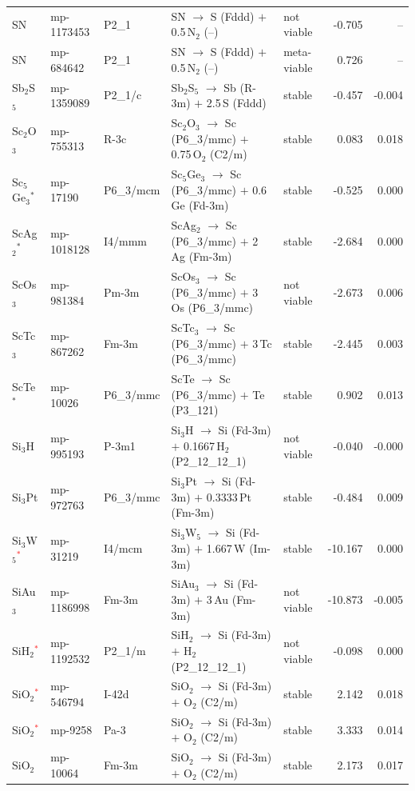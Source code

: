 \begin{longtable}{@{}ll l@{\hspace{4pt}} p{4.6cm} l@{\hspace{4pt}} rr@{}}
SN & mp-1173453 & P2\_1 & SN $\to$ S (Fddd) $+$ 0.5\,N$_{2}$ (--) & not viable & -0.705 & -- \\
SN & mp-684642 & P2\_1 & SN $\to$ S (Fddd) $+$ 0.5\,N$_{2}$ (--) & meta-viable & 0.726 & -- \\
Sb$_{2}$S$_{5}$ & mp-1359089 & P2\_1/c & Sb$_{2}$S$_{5}$ $\to$ Sb (R-3m) $+$ 2.5\,S (Fddd) & stable & -0.457 & -0.004 \\
Sc$_{2}$O$_{3}$ & mp-755313 & R-3c & Sc$_{2}$O$_{3}$ $\to$ Sc (P6\_3/mmc) $+$ 0.75\,O$_{2}$ (C2/m) & stable & 0.083 & 0.018 \\
Sc$_{5}$Ge$_{3}$$^*$ & mp-17190 & P6\_3/mcm & Sc$_{5}$Ge$_{3}$ $\to$ Sc (P6\_3/mmc) $+$ 0.6\,Ge (Fd-3m) & stable & -0.525 & 0.000 \\
ScAg$_{2}$$^*$ & mp-1018128 & I4/mmm & ScAg$_{2}$ $\to$ Sc (P6\_3/mmc) $+$ 2\,Ag (Fm-3m) & stable & -2.684 & 0.000 \\
ScOs$_{3}$ & mp-981384 & Pm-3m & ScOs$_{3}$ $\to$ Sc (P6\_3/mmc) $+$ 3\,Os (P6\_3/mmc) & not viable & -2.673 & 0.006 \\
ScTc$_{3}$ & mp-867262 & Fm-3m & ScTc$_{3}$ $\to$ Sc (P6\_3/mmc) $+$ 3\,Tc (P6\_3/mmc) & stable & -2.445 & 0.003 \\
ScTe$^*$ & mp-10026 & P6\_3/mmc & ScTe $\to$ Sc (P6\_3/mmc) $+$ Te (P3\_121) & stable & 0.902 & 0.013 \\
Si$_{3}$H & mp-995193 & P-3m1 & Si$_{3}$H $\to$ Si (Fd-3m) $+$ 0.1667\,H$_{2}$ (P2\_12\_12\_1) & not viable & -0.040 & -0.000 \\
Si$_{3}$Pt & mp-972763 & P6\_3/mmc & Si$_{3}$Pt $\to$ Si (Fd-3m) $+$ 0.3333\,Pt (Fm-3m) & stable & -0.484 & 0.009 \\
Si$_{3}$W$_{5}$\textcolor{red}{$^*$} & mp-31219 & I4/mcm & Si$_{3}$W$_{5}$ $\to$ Si (Fd-3m) $+$ 1.667\,W (Im-3m) & stable & -10.167 & 0.000 \\
SiAu$_{3}$ & mp-1186998 & Fm-3m & SiAu$_{3}$ $\to$ Si (Fd-3m) $+$ 3\,Au (Fm-3m) & not viable & -10.873 & -0.005 \\
SiH$_{2}$\textcolor{red}{$^*$} & mp-1192532 & P2\_1/m & SiH$_{2}$ $\to$ Si (Fd-3m) $+$ H$_{2}$ (P2\_12\_12\_1) & not viable & -0.098 & 0.000 \\
SiO$_{2}$\textcolor{red}{$^*$} & mp-546794 & I-42d & SiO$_{2}$ $\to$ Si (Fd-3m) $+$ O$_{2}$ (C2/m) & stable & 2.142 & 0.018 \\
SiO$_{2}$\textcolor{red}{$^*$} & mp-9258 & Pa-3 & SiO$_{2}$ $\to$ Si (Fd-3m) $+$ O$_{2}$ (C2/m) & stable & 3.333 & 0.014 \\
SiO$_{2}$ & mp-10064 & Fm-3m & SiO$_{2}$ $\to$ Si (Fd-3m) $+$ O$_{2}$ (C2/m) & stable & 2.173 & 0.017 \\

\end{longtable}
